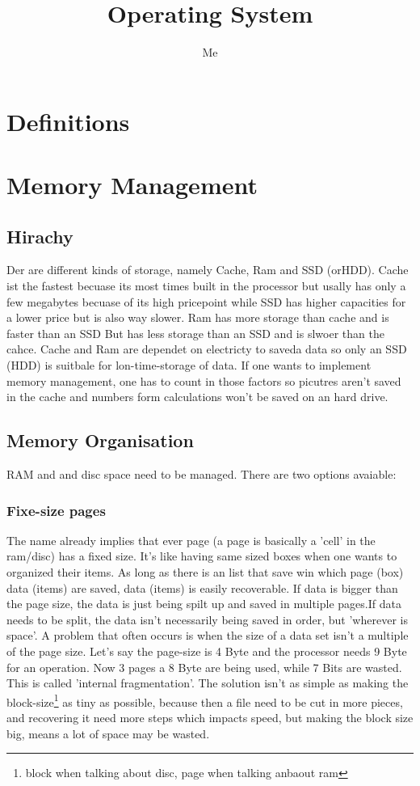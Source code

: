 \documentclass[a4paper]{scrartcl}
\author{Me}
\title{Operating System}
\begin{document}
    \maketitle
    \newpage
    \tableofcontents
    \newpage
    \section{Definitions}

    \section{Memory Management}
        \subsection{Hirachy} 
            Der are different kinds of storage,  namely Cache, Ram and SSD (orHDD). Cache ist the fastest becuase its most times built in the processor but usally
            has only a few megabytes becuase of its high pricepoint while SSD has higher capacities for a lower price but is also way slower. Ram has more storage than 
            cache and is faster than an SSD But has less storage than an SSD and is slwoer than the cahce. Cache and Ram are dependet on electricty to saveda data
            so only an SSD (HDD) is suitbale for lon-time-storage of data. If one wants to implement memory management, one has to count in those factors
            so picutres aren't saved in the cache and numbers form calculations won't be saved on an hard drive.
        \subsection{Memory Organisation}
            RAM and and disc space need to be managed. There are two options avaiable: 
            \subsubsection{Fixe-size pages}
                The name already implies that ever page (a page is basically a 'cell' in the ram/disc) has a fixed size. It's like having same sized boxes
                when one wants to organized their items. As long as there is an list that save win which page (box) data (items) are saved,  data (items) is
                easily recoverable. If data is bigger than the page size, the data is just being spilt up and saved in multiple pages.If data needs
                to be split, the data isn't necessarily being saved in order, but 'wherever is space'. A problem 
                that often occurs is when the size of a data set isn't a multiple of the page size. Let's say the page-size is 4 Byte and the processor needs
                9 Byte for an operation. Now 3 pages a 8 Byte are being used, while 7 Bits are wasted. This is called 'internal fragmentation'. The solution
                isn't as simple as making the block-size\footnote{block when talking about disc, page when talking anbaout ram} as tiny as possible, because 
                then a file need to be cut in more pieces, and recovering it need more steps which impacts speed, but making the block size big, means 
                a lot of space may be wasted.
\end{document}
